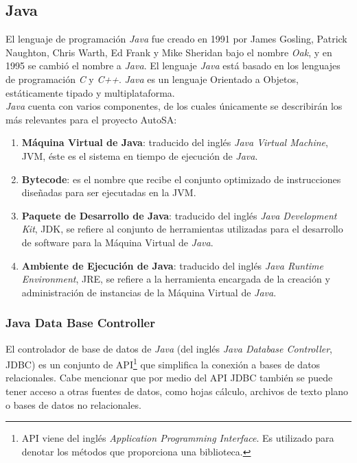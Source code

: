 \subsection{Java}\label{sec:java}

El lenguaje de programación \textit{Java} fue creado en 1991 por James Gosling, Patrick Naughton, Chris Warth, Ed Frank y Mike Sheridan bajo el nombre \textit{Oak}, y en 1995 se cambió el nombre a \textit{Java}. El lenguaje \textit{Java} está basado en los lenguajes de programación \textit{C} y \textit{C++}. \textit{Java} es un lenguaje Orientado a Objetos, estáticamente tipado y multiplataforma\cite{JavaCompleteReference, WellGroundedJavaDeveloper}.\\
\textit{Java} cuenta con varios componentes, de los cuales únicamente se describirán los más relevantes para el proyecto AutoSA\cite{JavaCompleteReference, WellGroundedJavaDeveloper}:
\begin{enumerate}
	\item \textbf{Máquina Virtual de Java}: traducido del inglés \textit{Java Virtual Machine}, JVM, éste es el sistema en tiempo de ejecución de \textit{Java}.
	\item \textbf{Bytecode}: es el nombre que recibe el conjunto optimizado de instrucciones diseñadas para ser ejecutadas en la JVM.
	\item \textbf{Paquete de Desarrollo de Java}: traducido del inglés \textit{Java Development Kit}, JDK, se refiere al conjunto de herramientas utilizadas para el desarrollo de software para la Máquina Virtual de \textit{Java}.
	\item \textbf{Ambiente de Ejecución de Java}: traducido del inglés \textit{Java Runtime Environment}, JRE, se refiere a la herramienta encargada de la creación y administración de instancias de la Máquina Virtual de \textit{Java}.
\end{enumerate}

\subsubsection{Java Data Base Controller}\label{sec:jdbc}
El controlador de base de datos de \textit{Java} (del inglés \textit{Java Database Controller}, JDBC) es un conjunto de API\footnote{API viene del inglés \textit{Application Programming Interface}. Es utilizado para denotar los métodos que proporciona una biblioteca.} que simplifica la conexión a bases de datos relacionales. Cabe mencionar que por medio del API JDBC también se puede tener acceso a otras fuentes de datos, como hojas cálculo, archivos de texto plano o bases de datos no relacionales\cite{JDBCRecipes, BeginingJava8APIs}.

